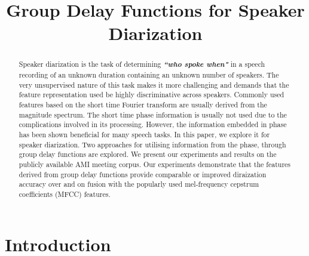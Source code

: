 \documentclass[conference]{IEEEtran}
\begin{document}
\title{Group Delay Functions for Speaker Diarization}

\author{
}

\maketitle


\begin{abstract}

Speaker diarization is the task of determining {\bf\textit{``who spoke when"}}
in a speech recording of an unknown duration containing an unknown number of
speakers. The very unsupervised nature of this task makes it more challenging
and demands that the feature representation used be  highly discriminative across 
speakers.
Commonly used features based on the short time Fourier transform are usually
derived from the magnitude spectrum. The short time phase information is usually
not used due to the complications involved in its processing. However, the information
embedded in phase has been shown beneficial for many speech tasks. In this
paper, we explore it for speaker diarization. Two approaches for utilising
information from the phase, through group delay functions are explored.
We present our experiments and results on the 
publicly available AMI meeting corpus. Our experiments demonstrate that the features
derived from group delay functions provide comparable or improved diraization
accuracy over and on fusion with the popularly used mel-frequency cepstrum
coefficients (MFCC) features. \\

\end{abstract}
\IEEEpeerreviewmaketitle



\section{Introduction}
\label{intro}
\end{document}
